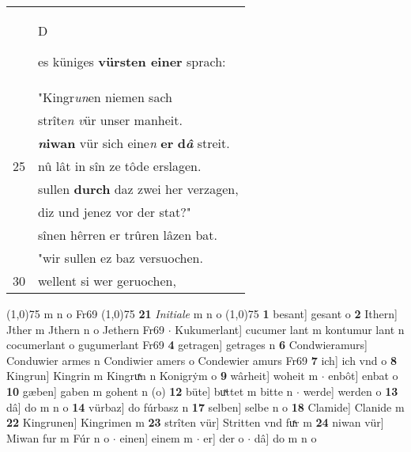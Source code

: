 \documentclass[8pt,a4paper,notitlepage]{article}
\begin{document}
\begin{table}[ht]
\begin{minipage}[t]{0.5\linewidth}
\begin{tabular}{rl}
 & \begin{large}D\end{large}es küniges \textbf{vürsten einer} sprach:\\ 
 & "Kingr\textit{un}en niemen sach\\ 
 & strîte\textit{n} \textit{v}ür unser manheit.\\ 
 & \textbf{\textit{n}iwan} vür sich eine\textit{n} \textbf{er} \textbf{d\textit{â}} streit.\\ 
25 & nû lât in sîn ze tôde erslagen.\\ 
 & sullen \textbf{durch} daz zwei her verzagen,\\ 
 & diz und jenez vor der stat?"\\ 
 & sînen hêrren er trûren lâzen bat.\\ 
 & "wir sullen ez baz versuochen.\\ 
30 & wellent si wer geruochen,\\ 
\end{tabular}
\scriptsize
\line(1,0){75} \newline
m n o Fr69 \newline
\line(1,0){75} \newline
\textbf{21} \textit{Initiale} m n o  \newline
\line(1,0){75} \newline
\textbf{1} besant] gesant o \textbf{2} Ithern] Jther m Jthern n o Jethern Fr69  $\cdot$ Kukumerlant] cucumer lant m kontumur lant n cocumerlant o gugumerlant Fr69 \textbf{4} getragen] getrages n \textbf{6} Condwieramurs] Conduwier armes n Condiwier amers o Condewier amurs Fr69 \textbf{7} ich] ich vnd o \textbf{8} Kingrun] Kingrin m Kingruͯn n Konigrẏm o \textbf{9} wârheit] woheit m  $\cdot$ enbôt] enbat o \textbf{10} gæben] gaben m gohent n (o) \textbf{12} büte] buͯttet m bitte n  $\cdot$ werde] werden o \textbf{13} dâ] do m n o \textbf{14} vürbaz] do fúrbasz n \textbf{17} selben] selbe n o \textbf{18} Clamide] Clanide m \textbf{22} Kingrunen] Kingrimen m \textbf{23} strîten vür] Stritten vnd fuͯr m \textbf{24} niwan vür] Miwan fur m Fúr n o  $\cdot$ einen] einem m  $\cdot$ er] der o  $\cdot$ dâ] do m n o \newline
\end{minipage}
\end{table}
\newpage
\end{document}
